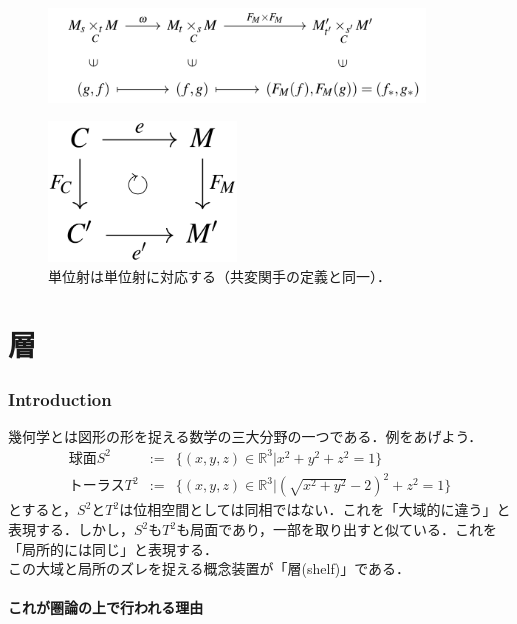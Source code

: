 \documentclass[uplatex, 12pt, a4paper, dvipdfmx]{jsarticle}
\begin{document}
\begin{figure}[ht]\begin{center} \caption{\label{cd-10}}\includegraphics[width=10cm]{cd-10.png} \end{center}\end{figure}

\begin{figure}[ht]\begin{center} \caption{単位射は単位射に対応する（共変関手の定義と同一）．}
    \includegraphics[width=5cm]{cd-7.png}
\end{center}\end{figure}

\part{層}

\section{Introduction}

幾何学とは図形の形を捉える数学の三大分野の一つである．例をあげよう．
\begin{eqnarray*}球面S^2 &:=& \{ (x,y,z) \in \mathbb{R}^3 | x^2+y^2+z^2 = 1 \} \\ トーラスT^2 &:=& \{ (x,y,z)\in\mathbb{R}^3 | (\sqrt{x^2+y^2}-2)^2 + z^2 = 1 \}\end{eqnarray*}
とすると，$S^2$と$T^2$は位相空間としては同相ではない．これを「大域的に違う」と表現する．しかし，$S^2$も$T^2$も局面であり，一部を取り出すと似ている．これを「局所的には同じ」と表現する．\\
この大域と局所のズレを捉える概念装置が「層(shelf)」である．

\subsection{これが圏論の上で行われる理由}
\end{document}

